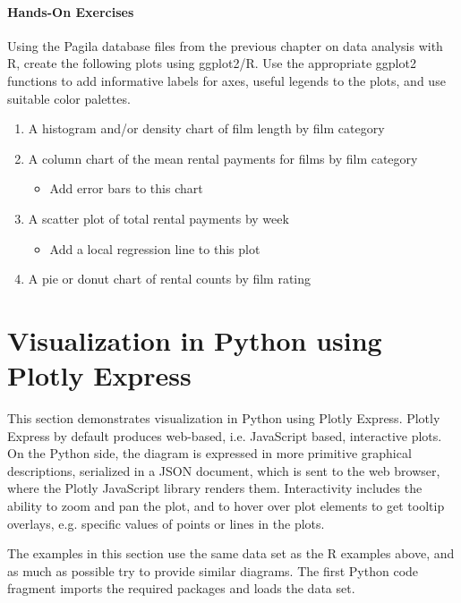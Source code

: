 \begin{tcolorbox}[colback=code]
\paragraph*{Hands-On Exercises}

Using the Pagila database files from the previous chapter on data analysis with R, create the following plots using ggplot2/R. Use the appropriate ggplot2 functions to add informative labels for axes, useful legends to the plots, and use suitable color palettes. 

\begin{enumerate}
   \item A histogram and/or density chart of film length by film category
   \item A column chart of the mean rental payments for films by film category
   \begin{itemize}
      \item Add error bars to this chart
   \end{itemize}
   \item A scatter plot of total rental payments by week
   \begin{itemize}
      \item Add a local regression line to this plot
   \end{itemize}
   \item A pie or donut chart of rental counts by film rating
\end{enumerate}
\end{tcolorbox}

\FloatBarrier

\section{Visualization in Python using Plotly Express}

This section demonstrates visualization in Python using Plotly Express. Plotly Express by default produces web-based, i.e. JavaScript based, interactive plots. On the Python side, the diagram is expressed in more primitive graphical descriptions, serialized in a JSON document, which is sent to the web browser, where the Plotly JavaScript library renders them. Interactivity includes the ability to zoom and pan the plot, and to hover over plot elements to get tooltip overlays, e.g. specific values of points or lines in the plots.  

The examples in this section use the same data set as the R examples above, and as much as possible try to provide similar diagrams. The first Python code fragment imports the required packages and loads the data set. 

